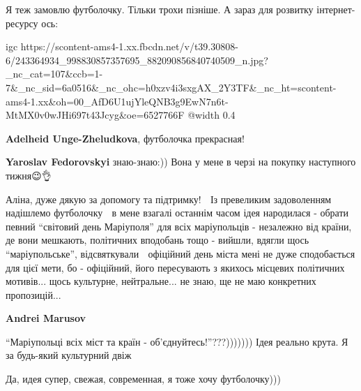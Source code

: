  
 
 
 
 

\qqSecCmt


Я теж замовлю футболочку. Тільки трохи пізніше. А зараз для розвитку інтернет-ресурсу ось:

\ifcmt
  igc https://scontent-ams4-1.xx.fbcdn.net/v/t39.30808-6/243364934_998830857357695_882090856840740509_n.jpg?_nc_cat=107&ccb=1-7&_nc_sid=6a0516&_nc_ohc=h0xzv4i3sxgAX_2Y3TF&_nc_ht=scontent-ams4-1.xx&oh=00_AfD6U1ujYleQNB3g9EwN7n6t-MtMX0v0wJHi697t43Jcyg&oe=6527766F
	@width 0.4
\fi

\begin{itemize} %
\textbf{Adelheid Unge-Zheludkova}, футболочка прекрасная!

\textbf{Yaroslav Fedorovskyi} знаю-знаю:))
Вона у мене в черзі на покупку наступного тижня😉👌


Аліна, дуже дякую за допомогу та підтримку! 🙂 Із превеликим задоволенням
надішлемо футболочку 🙂 в мене взагалі останнім часом ідея народилася - обрати
певний \enquote{світовий день Маріуполя} для всіх маріупольців - незалежно від країни,
де вони мешкають, політичних вподобань тощо - вийшли, вдягли щось
\enquote{маріупольське}, відсвяткували 🙂 офіційний день міста мені не дуже
сподобається для цієї мети, бо - офіційний, його пересувають з якихось місцевих
політичних мотивів... щось культурне, нейтральне... не знаю, ще не маю
конкретних пропозицій...

\textbf{Andrei Marusov} \par\enquote{Маріупольці всіх міст та країн - об'єднуйтесь!}???)))))))
Ідея реально крута. Я за будь-який культурний двіж 💪

\end{itemize} %


Да, идея супер, свежая, современная, я тоже хочу футболочку)))

